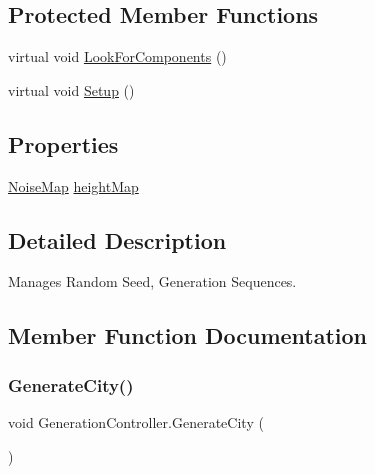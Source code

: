 \subsection*{Protected Member Functions}
\begin{DoxyCompactItemize}
\item 
virtual void \mbox{\hyperlink{class_generation_controller_a178f4eb6bcb5cbe94a7d67cb8685857f}{Look\+For\+Components}} ()
\item 
virtual void \mbox{\hyperlink{class_generation_controller_acc6ec4bf38f4982c3d727a36b6aed321}{Setup}} ()
\end{DoxyCompactItemize}
\subsection*{Properties}
\begin{DoxyCompactItemize}
\item 
\mbox{\hyperlink{class_noise_map}{Noise\+Map}} \mbox{\hyperlink{class_generation_controller_ada5207d54f73a82b066d367a65dd6035}{height\+Map}}
\end{DoxyCompactItemize}


\subsection{Detailed Description}
Manages Random Seed, Generation Sequences. 



\subsection{Member Function Documentation}
\mbox{\label{class_generation_controller_a45c2cd12e416dd1445b5182a6a2a7693}} 
\subsubsection{\texorpdfstring{Generate\+City()}{GenerateCity()}}
{\footnotesize\ttfamily void Generation\+Controller.\+Generate\+City (\begin{DoxyParamCaption}{ }\end{DoxyParamCaption})}

